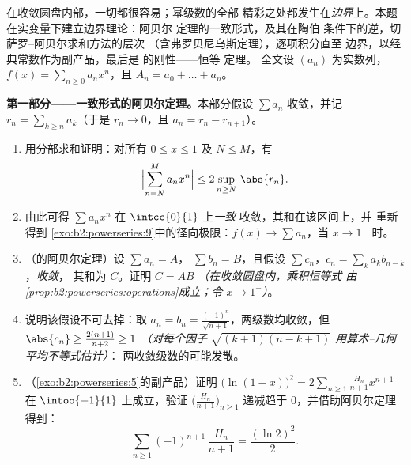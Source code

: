 \begin{problem}\label{pb:b2:powerseries:1}
在收敛圆盘内部，一切都很容易；幂级数的全部
精彩之处都发生在\emph{边界}上。本题
在实变量下建立边界理论：阿贝尔
定理的一致形式，及其在陶伯
条件下的逆，切萨罗--阿贝尔求和方法的层次
（含弗罗贝尼乌斯定理），逐项积分直至
边界，以经典常数作为副产品，最后是
的刚性——恒等
定理。
全文设 $(a_n)$ 为实数列，$f(x) = \sum_{n\geq0}
a_nx^n$，且 $A_n = a_0 + \dots + a_n$。

\medskip
\noindent\textbf{第一部分——一致形式的阿贝尔定理。}本部分假设
$\sum a_n$ 收敛，并记 $r_n =
\sum_{k\geq n} a_k$（于是 $r_n \to 0$，且 $a_n = r_n -
r_{n+1}$）。
\begin{enumerate}
  \item 用分部求和证明：对所有 $0 \leq x
        \leq 1$ 及 $N \leq M$，有
        \[
        \Bigl|\sum_{n=N}^{M} a_n x^n\Bigr|
        \leq 2\sup_{n \geq N}\,\abs{r_n} .
        \]
  \item 由此可得 $\sum a_nx^n$ 在 $\intcc{0}{1}$ 上\emph{一致}
        收敛，其和在该区间上，并
        重新得到
        \cref{exo:b2:powerseries:9}中的径向极限：$f(x) \to \sum a_n$，当 $x
        \to 1^-$ 时。
  \item （的阿贝尔定理）设 $\sum a_n = A$，
        $\sum b_n = B$，且假设 $\sum
        c_n$，$c_n = \sum_{k} a_kb_{n-k}$，\emph{收敛}，
        其和为 $C$。证明 $C = AB$ \emph{（在收敛圆盘内，乘积恒等式
        由
        \cref{prop:b2:powerseries:operations}成立；令 $x \to
        1^-$）}。
  \item 说明该假设不可去掉：取 $a_n = b_n =
        \frac{(-1)^n}{\sqrt{n+1}}$，两级数均收敛，但
        $\abs{c_n} \geq \frac{2(n+1)}{n+2} \geq 1$ \emph{（对每个因子
        $\sqrt{(k+1)(n-k+1)}$ 用算术--几何平均不等式估计）}：
        两收敛级数的可能发散。
  \item （\cref{exo:b2:powerseries:5}的副产品）证明
        $\bigl(\ln(1-x)\bigr)^2 = 2\sum_{n\geq1}
        \frac{H_n}{n+1}x^{n+1}$ 在 $\intoo{-1}{1}$ 上成立，验证
        $\bigl(\frac{H_n}{n+1}\bigr)_{n\geq1}$ 递减趋于
        $0$，并借助阿贝尔定理得到：
        \[
        \sum_{n\geq1} (-1)^{n+1}\,\frac{H_n}{n+1}
        = \frac{(\ln 2)^2}{2} .
        \]
\end{enumerate}


\end{problem}
